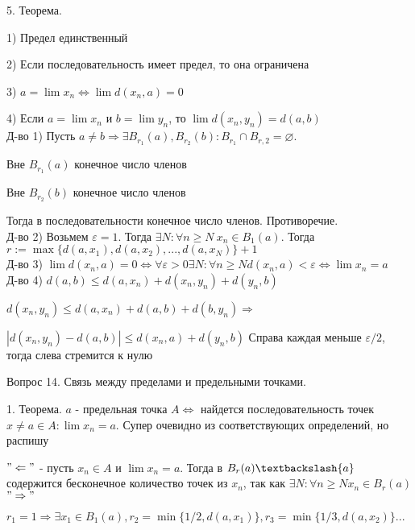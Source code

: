 \documentclass[12pt]{article}
\begin{document}
5. Теорема.

1) Предел единственный

2) Если последовательность имеет предел, то она ограничена

3) $a=\lim x_n \Leftrightarrow \lim d(x_n, a)=0$

4) Если $a=\lim x_n$ и $b = \lim y_n$, то $\lim d(x_n, y_n) = d(a, b)$\\

Д-во 1) Пусть $a\neq b \Rightarrow \exists B_{r_1}(a), B_{r_2}(b) : B_{r_1} \cap B_{r, 2} = \varnothing$. 

Вне $B_{r_1}(a)$ конечное число членов

Вне $B_{r_2}(b)$ конечное число членов

Тогда в последовательности конечное число членов. Противоречие.\\

Д-во 2) Возьмем $\varepsilon=1$. Тогда $\exists N: \forall n\geq N\ x_n \in B_1(a)$. Тогда $r:= \max\{d(a, x_1), d(a, x_2),..., d(a, x_N)\}+1$\\

Д-во 3) $\lim d(x_n, a)=0 \Leftrightarrow \forall \varepsilon > 0 \exists N : \forall n \geq N d(x_n, a) < \varepsilon \Leftrightarrow \lim x_n = a$\\

Д-во 4) $d(a, b) \leq d(a, x_n)+d(x_n, y_n)+d(y_n, b)$

$d(x_n, y_n) \leq d(a, x_n)+d(a, b)+d(b, y_n) \Rightarrow$

$|d(x_n, y_n)-d(a, b)|\leq d(x_n, a)+d(y_n, b)$ Справа каждая меньше $\varepsilon /2$, тогда слева стремится к нулю
\newpage

\begin{center}
Вопрос 14. Связь между пределами и предельными точками.
\end{center}

1. Теорема. $a$ - предельная точка $A \Leftrightarrow$ найдется последовательность точек $x\neq a \in A : \lim x_n = a$. Супер очевидно из соответствующих определений, но распишу

$"\Leftarrow"$ - пусть $x_n \in A$ и $\lim x_n = a$. Тогда в $B_r(a)\textbackslash \{a\}$ содержится бесконечное количество точек из $x_n$, так как $\exists N : \forall n \geq N x_n \in B_r(a)$\\

$"\Rightarrow"$

$r_1 = 1 \Rightarrow \exists x_1 \in B_1(a), r_2 = \min\{1/2, d(a, x_1)\}, r_3=\min\{1/3, d(a, x_2)\}...$
\end{document}
